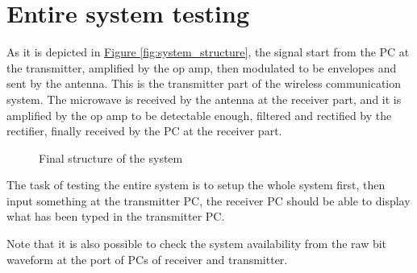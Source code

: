 \documentclass[12pt,a4paper]{report}
\begin{document}
\chapter{Entire system testing}
As it is depicted in \hyperref[fig:system_structure]{Figure \ref*{fig:system_structure}}, the signal start from the PC at the transmitter, amplified by the op amp, then modulated to be envelopes and sent by the antenna. This is the transmitter part of the wireless communication system. The microwave is received by the antenna at the receiver part, and it is amplified by the op amp to be detectable enough, filtered and rectified by the rectifier, finally received by the PC at the receiver part.

\begin{figure}[ht]
    
    \caption{Final structure of the system}
    \label{fig:final_structure}
\end{figure}

The task of testing the entire system is to setup the whole system first, then input something at the transmitter PC, the receiver PC should be able to display what has been typed in the transmitter PC.

Note that it is also possible to check the system availability from the raw bit waveform at the port of PCs of receiver and transmitter.
\end{document}
